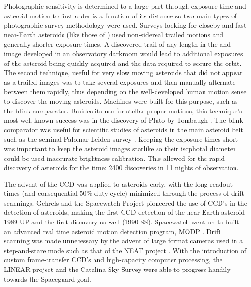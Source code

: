 Photographic sensitivity is determined to a large part through
exposure time and asteroid motion to first order is a function of its
distance so two main types of photographic survey methodology were
used.  Surveys looking for closeby and fast near-Earth asteroids (like
those of \cite{1988NASTM4041...52S}) used non-sidereal trailed motions
and generally shorter exposure times.  A discovered trail of any
length in the and image developed in an observatory darkroom would
lead to additional exposures of the asteroid being quickly acquired
and the data required to secure the orbit.  The second technique,
useful for very slow moving asteroids that did not appear as a trailed
images was to take several exposures and then manually alternate
between them rapidly, thus depending on the well-developed human
motion sense to discover the moving asteroids.  Machines were built
for this purpose, such as the blink comparator.  Besides its use for
stellar proper motions, this technique's most well known success was
in the discovery of Pluto by Tombaugh \citep{1960S&T....19..264T}.
The blink comparator was useful for scientific studies of asteroids in
the main asteroid belt such as the seminal Palomar-Leiden survey
\citep{1970A&AS....2..339V}.  Keeping the exposure times short was
important to keep the asteroid images starlike so their isophotal
diameter could be used inaccurate brightness calibration.  This
allowed for the rapid discovery of asteroids for the time: 2400
discoveries in 11 nights of observation.

The advent of the CCD was applied to asteroids early, with the long
readout times (and consequential 50\% duty cycle) minimized through
the process of drift scannings.  Gehrels and the Spacewatch Project
\citep{1990ASPC....8...51G} pioneered the use of CCD's in the
detection of asteroids, making the first CCD detection of the
near-Earth asteroid 1989 UP and the first discovery as well (1990 SS).
Spacewatch went on to built an advanced real time asteroid motion
detection program, MODP \citep{1991AJ....101.1518R}.  Drift scanning
was made unnecessary by the advent of large format cameras used in a
step-and-stare mode such as that of the NEAT project
\citep{1999AJ....117.1616P}.  With the introduction of custom
frame-transfer CCD's and high-capacity computer processing, the LINEAR
project \citep{2000Icar..148...21S} and the Catalina Sky Survey
\citep{2007IAUS..236..323L} were able to progress handily towards the
Spaceguard goal.

